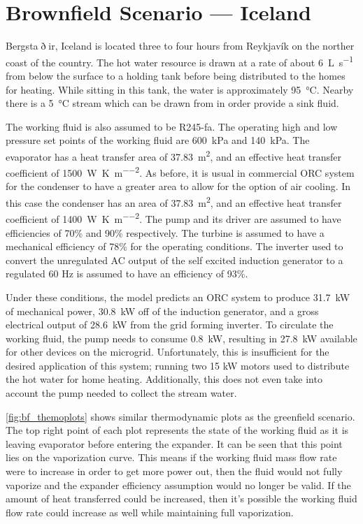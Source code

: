 \section{Brownfield Scenario --- Iceland}
Bergsta$\eth$ir, Iceland is located three to four hours from Reykjavík on the norther coast of the country. The hot water resource is drawn at a rate of about \SI{6}{\liter\per\second} from below the surface to a holding tank before being distributed to the homes for heating. While sitting in this tank, the water is approximately \SI{95}{\degreeCelsius}. Nearby there is a \SI{5}{\degreeCelsius} stream which can be drawn from in order provide a sink fluid.

The working fluid is also assumed to be R245-fa. The operating high and low pressure set points of the working fluid are \SI{600}{\kilo\pascal} and \SI{140}{\kilo\pascal}. The evaporator has a heat transfer area of \SI{37.83}{\meter\squared}, and an effective heat transfer coefficient of \SI{1500}{\watt\per\kelvin\per\meter\squared}. As before, it is usual in commercial ORC system for the condenser to have a greater area to allow for the option of air cooling. In this case the condenser has an area of \SI{37.83}{\meter\squared}, and an effective heat transfer coefficient of \SI{1400}{\watt\per\kelvin\per\meter\squared}. The pump and its driver are assumed to have efficiencies of 70\% and 90\% respectively. The turbine is assumed to have a mechanical efficiency of 78\% for the operating conditions.
The inverter used to convert the unregulated AC output of the self excited induction generator to a regulated 60 Hz is assumed to have an efficiency of 93\%.

Under these conditions, the model predicts an ORC system to produce \SI{31.7}{\kilo\watt} of mechanical power, \SI{30.8}{\kilo\watt} off of the induction generator, and a gross electrical output of \SI{28.6}{\kilo\watt} from the grid forming inverter. To circulate the working fluid, the pump needs to consume \SI{0.8}{\kilo\watt}, resulting in \SI{27.8}{\kilo\watt} available for other devices on the microgrid. Unfortunately, this is insufficient for the desired application of this system;  running two 15 kW motors used to distribute the hot water for home heating. Additionally, this does not even take into account the pump needed to collect the stream water.

\autoref{fig:bf_themoplots} shows similar thermodynamic plots as the greenfield scenario. The top right point of each plot represents the state of the working fluid as it is leaving evaporator before entering the expander. It can be seen that this point lies on the vaporization curve. This means if the working fluid mass flow rate were to increase in order to get more power out, then the fluid would not fully vaporize and the expander efficiency assumption would no longer be valid.
If the amount of heat transferred could be increased, then it's possible the working fluid flow rate could increase as well while maintaining full vaporization. 






